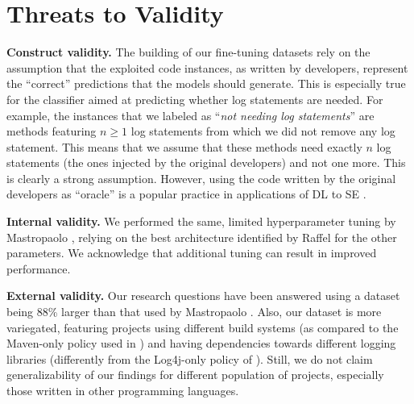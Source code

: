 \section{Threats to Validity} \label{sec:threats}

\textbf{Construct validity.} The building of our fine-tuning datasets rely on the assumption that the exploited code instances, as written by developers, represent the ``correct'' predictions that the models should generate. This is especially true for the classifier aimed at predicting whether log statements are needed. For example, the instances that we labeled as ``\emph{not needing log statements}'' are methods featuring $n \geq 1$ log statements from which we did not remove any log statement. This means that we assume that these methods need exactly $n$ log statements (\ie the ones injected by the original developers) and not one more. This is clearly a strong assumption. However, using the code written by the original developers as ``oracle'' is a popular practice in applications of DL to SE \cite{tufano2022using, Tufano:tosem2019, mastropaolo2021empirical, mastropaolo2022using, tufano-mutants, watson2020learning, tufano2022generating}.


\textbf{Internal validity.}  We performed the same, limited hyperparameter tuning by Mastropaolo \etal \cite{mastropaolo2021studying}, relying on the best architecture identified by Raffel \etal \cite{raffel2019exploring} for the other parameters. We acknowledge that additional tuning can result in improved performance.


\textbf{External validity.} Our research questions have been answered using a dataset being 88\% larger than that used by Mastropaolo \etal \cite{mastropaolo2021studying}. Also, our dataset is more variegated, featuring projects using different build systems (as compared to the Maven-only policy used in \cite{mastropaolo2021studying}) and having dependencies towards different logging libraries (differently from the Log4j-only policy of \cite{mastropaolo2021studying}). Still, we do not claim generalizability of our findings for different population of projects, especially those written in other programming languages.